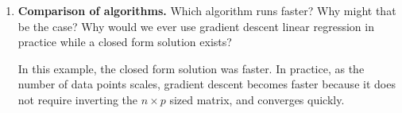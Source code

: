 \begin{enumerate}
	\item \textbf{Comparison of algorithms.} Which algorithm runs faster? Why might that be the case? Why would we ever use gradient descent linear regression in practice while a closed form solution exists?
	
	In this example, the closed form solution was faster. In practice, as the number of data points scales, gradient descent becomes faster because it does not require inverting the $n \times p$ sized matrix, and converges quickly.
\end{enumerate}
